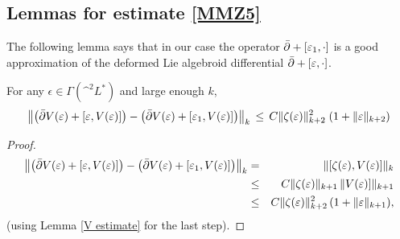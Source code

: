 \documentclass{article}
\begin{document}
\subsection{Lemmas for estimate \eqref{MMZ5}}

The following lemma says that in our case the operator $\bar{\partial} + [\varepsilon_1,\cdot]$ is a good approximation of the deformed Lie algebroid differential $\bar{\partial} + [\varepsilon,\cdot]$.
\begin{lem}\label{estimate d_L}
For any $\epsilon \in \Gamma(\^ ^2 L^*)$ and large enough $k$,
$$\left\|\left(\bar{\partial} V(\varepsilon) + [\varepsilon,V(\varepsilon)]\right) - \left(\bar{\partial} V(\varepsilon) + [\varepsilon_1,V(\varepsilon)]\right)\right\|_k \,\leq\,
C \|\zeta(\varepsilon)\|_{k+2}^2 \; (1 + \|\varepsilon\|_{k+2})$$
\end{lem}
\begin{proof}
\begin{eqnarray*}
\left\|\left(\bar{\partial} V(\varepsilon) + [\varepsilon,V(\varepsilon)]\right) - \left(\bar{\partial} V(\varepsilon) + [\varepsilon_1,V(\varepsilon)]\right)\right\|_k &=& \|[\zeta(\varepsilon),V(\varepsilon)]\|_k \\
&\leq& C \|\zeta(\varepsilon)\|_{k+1}\, \|V(\varepsilon)]\|_{k+1} \\
&\leq& C \|\zeta(\varepsilon)\|_{k+2}^2\, (1+\|\varepsilon\|_{k+1}),
\end{eqnarray*}
(using Lemma \ref{V estimate} for the last step).
\end{proof}
\end{document}
